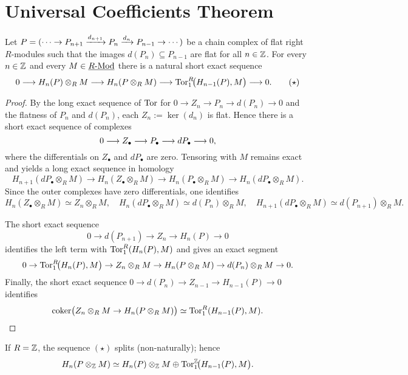 \section{Universal Coefficients Theorem}

\begin{theorem*}
	Let \( P=(\dotsm \to P_{n+1} \xrightarrow{d_{n+1}} P_n \xrightarrow{d_n} P_{n-1}\to\dotsm) \) be a chain complex of flat right \( R \)-modules such that the images \( d(P_n)\subseteq P_{n-1} \) are flat for all \( n\in\mathbb{Z} \). For every \( n\in\mathbb{Z} \) and every \( M\in \underline{R\text{-}\mathrm{Mod}} \) there is a natural short exact sequence
	\[
		0 \longrightarrow H_n(P)\otimes_R M \longrightarrow H_n(P\otimes_R M) \longrightarrow \operatorname{Tor}^{R}_1\!\bigl(H_{n-1}(P), M\bigr) \longrightarrow 0. \tag{$\star$}
	\]
\end{theorem*}
\begin{proof}
	By the long exact sequence of \( \operatorname{Tor} \) for \( 0\to Z_n \to P_n \to d(P_n) \to 0 \) and the flatness of \( P_n \) and \( d(P_n) \), each \( Z_n:=\ker(d_n) \) is flat. Hence there is a short exact sequence of complexes
	\[
		0 \longrightarrow Z_{\bullet} \longrightarrow P_{\bullet} \longrightarrow dP_{\bullet} \longrightarrow 0,
	\]
	where the differentials on \( Z_{\bullet} \) and \( dP_{\bullet} \) are zero. Tensoring with \( M \) remains exact and yields a long exact sequence in homology
	\[
		H_{n+1}(dP_{\bullet}\otimes_R M) \to H_n(Z_{\bullet}\otimes_R M) \to H_n(P_{\bullet}\otimes_R M) \to H_n(dP_{\bullet}\otimes_R M).
	\]
	Since the outer complexes have zero differentials, one identifies
	\[
		H_n(Z_{\bullet}\otimes_R M) \simeq Z_n\otimes_R M, \quad H_n(dP_{\bullet}\otimes_R M) \simeq d(P_n)\otimes_R M, \quad H_{n+1}(dP_{\bullet}\otimes_R M) \simeq d(P_{n+1})\otimes_R M.
	\]

	The short exact sequence
	\[
		0\to d(P_{n+1})\to Z_n\to H_n(P)\to 0
	\]
	identifies the left term with \( \operatorname{Tor}_1^{R}(H_n(P),M) \) and gives an exact segment
	\[
		0\to \operatorname{Tor}_1^R\!\bigl(H_n(P),M\bigr) \to Z_n\otimes_R M \to H_n(P\otimes_R M) \to d(P_n)\otimes_R M \to 0.
	\]
	Finally, the short exact sequence \( 0\to d(P_n)\to Z_{n-1}\to H_{n-1}(P)\to 0 \) identifies
	\[
		\operatorname{coker}\bigl(Z_n\otimes_R M \to H_n(P\otimes_R M)\bigr) \simeq \operatorname{Tor}_1^{R}(H_{n-1}(P),M).
	\]
\end{proof}

\begin{corollary*}
	If \( R=\mathbb{Z} \), the sequence \( (\star) \) splits (non-naturally); hence
	\[
		H_n(P\otimes_{\mathbb{Z}} M) \simeq H_n(P)\otimes_{\mathbb{Z}} M \oplus \operatorname{Tor}^{\mathbb{Z}}_1\!\bigl(H_{n-1}(P),M\bigr).
	\]
\end{corollary*}

